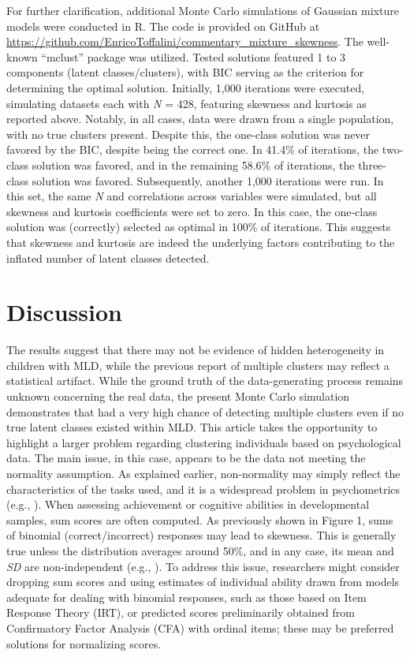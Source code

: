 \documentclass[letterpaper,11pt]{article}
\begin{document}
For further clarification, additional Monte Carlo simulations of Gaussian mixture models were conducted in R. The code is provided on GitHub at \url{https://github.com/EnricoToffalini/commentary_mixture_skewness}. The well-known “mclust” package \cite{scrucca2016mclust} was utilized. Tested solutions featured 1 to 3 components (latent classes/clusters), with BIC serving as the criterion for determining the optimal solution. Initially, 1,000 iterations were executed, simulating datasets each with \textit{N} = 428, featuring skewness and kurtosis as reported above. Notably, in all cases, data were drawn from a single population, with no true clusters present. Despite this, the one-class solution was never favored by the BIC, despite being the correct one. In 41.4\% of iterations, the two-class solution was favored, and in the remaining 58.6\% of iterations, the three-class solution was favored. Subsequently, another 1,000 iterations were run. In this set, the same \textit{N} and correlations across variables were simulated, but all skewness and kurtosis coefficients were set to zero. In this case, the one-class solution was (correctly) selected as optimal in 100\% of iterations. This suggests that skewness and kurtosis are indeed the underlying factors contributing to the inflated number of latent classes detected.

\section*{Discussion}

The results suggest that there may not be evidence of hidden heterogeneity in children with MLD, while the previous report of multiple clusters may reflect a statistical artifact. While the ground truth of the data-generating process remains unknown concerning the real data, the present Monte Carlo simulation demonstrates that  had a very high chance of detecting multiple clusters even if no true latent classes existed within MLD. This article takes the opportunity to highlight a larger problem regarding clustering individuals based on psychological data. The main issue, in this case, appears to be the data not meeting the normality assumption. As explained earlier, non-normality may simply reflect the characteristics of the tasks used, and it is a widespread problem in psychometrics (e.g., ). When assessing achievement or cognitive abilities in developmental samples, sum scores are often computed. As previously shown in Figure 1, sums of binomial (correct/incorrect) responses may lead to skewness. This is generally true unless the distribution averages around 50\%, and in any case, its mean and \textit{SD} are non-independent (e.g., ). To address this issue, researchers might consider dropping sum scores and using estimates of individual ability drawn from models adequate for dealing with binomial responses, such as those based on Item Response Theory (IRT), or predicted scores preliminarily obtained from Confirmatory Factor Analysis (CFA) with ordinal items; these may be preferred solutions for normalizing scores.
\end{document}
